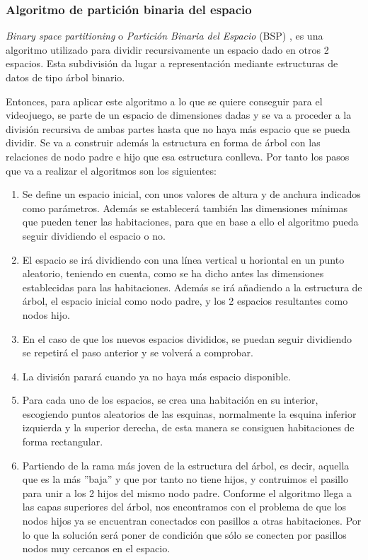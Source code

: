 \subsubsection{Algoritmo de partición binaria del espacio}

\textit{Binary space partitioning} o \textit{Partición Binaria del Espacio} (BSP) \cite{BSP}, es una algoritmo utilizado para dividir recursivamente un espacio dado en otros 2 espacios. Esta subdivisión da lugar a representación mediante estructuras de datos de tipo árbol binario.

Entonces, para aplicar este algoritmo a lo que se quiere conseguir para el videojuego, se parte de un espacio de dimensiones dadas y se va a proceder a la división recursiva de ambas partes hasta que no haya más espacio que se pueda dividir. Se va a construir además la estructura en forma de árbol con las relaciones de nodo padre e hijo que esa estructura conlleva. Por tanto los pasos que va a realizar el algoritmos son los siguientes:

\begin{enumerate}
    \item Se define un espacio inicial, con unos valores de altura y de anchura indicados como parámetros. Además se establecerá también las dimensiones mínimas que pueden tener las habitaciones, para que en base a ello el algoritmo pueda seguir dividiendo el espacio o no.
    
    \item El espacio se irá dividiendo con una línea vertical u horiontal en un punto aleatorio, teniendo en cuenta, como se ha dicho antes las dimensiones establecidas para las habitaciones. Además se irá añadiendo a la estructura de árbol, el espacio inicial como nodo padre, y los 2 espacios resultantes como nodos hijo.
    
    \item En el caso de que los nuevos espacios divididos, se puedan seguir dividiendo se repetirá el paso anterior y se volverá a comprobar.
    
    \item La división parará cuando ya no haya más espacio disponible.
    
    \item Para cada uno de los espacios, se crea una habitación en su interior, escogiendo puntos aleatorios de las esquinas, normalmente la esquina inferior izquierda y la superior derecha, de esta manera se consiguen habitaciones de forma rectangular. 
    
    \item Partiendo de la rama más joven de la estructura del árbol, es decir, aquella que es la más ''baja'' y que por tanto no tiene hijos, y contruimos el pasillo para unir a los 2 hijos del mismo nodo padre. Conforme el algoritmo llega a las capas superiores del árbol, nos encontramos con el problema de que los nodos hijos ya se encuentran conectados con pasillos a otras habitaciones. Por lo que la solución será poner de condición que sólo se conecten por pasillos nodos muy cercanos en el espacio.  
    
\end{enumerate}

